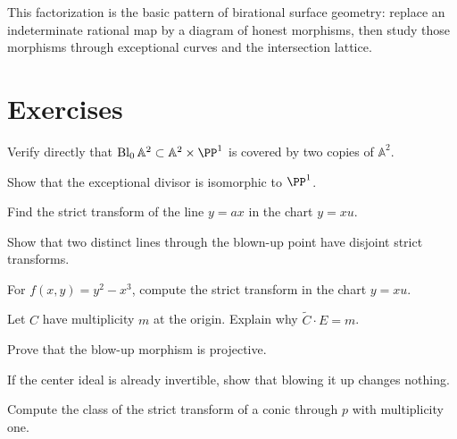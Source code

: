 This factorization is the basic pattern of birational surface geometry: replace an indeterminate rational map by a diagram of honest morphisms, then study those morphisms through exceptional curves and the intersection lattice.

\section{Exercises}

\begin{exercise}\label{exr:vi45-01}
Verify directly that \(\Bl_0\mathbb A^2\subset\mathbb A^2\times\PP^1\) is covered by two copies of \(\mathbb A^2\).
\end{exercise}

\begin{exercise}\label{exr:vi45-02}
Show that the exceptional divisor is isomorphic to \(\PP^1\).
\end{exercise}

\begin{exercise}\label{exr:vi45-03}
Find the strict transform of the line \(y=ax\) in the chart \(y=xu\).
\end{exercise}

\begin{exercise}\label{exr:vi45-04}
Show that two distinct lines through the blown-up point have disjoint strict transforms.
\end{exercise}

\begin{exercise}\label{exr:vi45-05}
For \(f(x,y)=y^2-x^3\), compute the strict transform in the chart \(y=xu\).
\end{exercise}

\begin{exercise}\label{exr:vi45-06}
Let \(C\) have multiplicity \(m\) at the origin.  Explain why \(\widetilde C\cdot E=m\).
\end{exercise}

\begin{exercise}\label{exr:vi45-07}
Prove that the blow-up morphism is projective.
\end{exercise}

\begin{exercise}\label{exr:vi45-08}
If the center ideal is already invertible, show that blowing it up changes nothing.
\end{exercise}

\begin{exercise}\label{exr:vi45-09}
Compute the class of the strict transform of a conic through \(p\) with multiplicity one.
\end{exercise}

